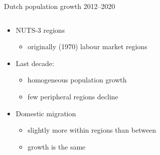 \documentclass{beamer}
\begin{document}
\begin{frame}{Dutch population growth 2012--2020}
\begin{columns}
	\begin{column}{0.5\textwidth}
	\begin{itemize}
		\item NUTS-3 regions
		\begin{itemize}
			\item originally (1970) labour market regions \newline
		\end{itemize}
		\item Last decade:
		\begin{itemize}
			\item homogeneous population growth
			\item \alert{few} peripheral regions decline\newline
		\end{itemize}
		\item Domestic migration
			\begin{itemize}
				\item slightly more \alert{within} regions than \alert{between} 
				\item growth is the \alert{same}
			\end{itemize}
	\end{itemize}
	\end{column}
	\begin{column}{0.5\textwidth}
		\begin{center}

\end{center}
\end{column}
\end{columns}
\end{frame}
\end{document}
